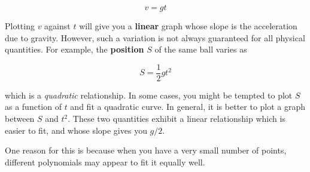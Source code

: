\begin{equation*}
    v = g t
\end{equation*}

Plotting $v$ against $t$ will give you a \textbf{linear} graph whose slope is the acceleration due to gravity. However, such a variation is not always guaranteed for all physical quantities. For example, the \textbf{position} $S$ of the same ball varies as

\begin{equation*}
    S = \frac{1}{2} g t^2
\end{equation*}

which is a \textit{quadratic} relationship. In some cases, you might be tempted to plot $S$ as a function of $t$ and fit a quadratic curve. In general, it is better to plot a graph between $S$ and $t^2$. These two quantities exhibit a linear relationship which is easier to fit, and whose slope gives you $g/2$.

One reason for this is because when you have a very small number of points, different polynomials may appear to fit it equally well.








































